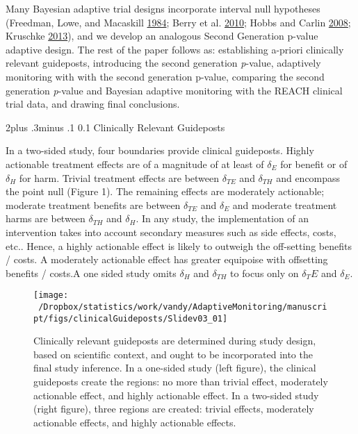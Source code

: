 \documentclass[12pt,oneside]{book}
\makeatletter
\newlength{\li}\setlength{\li}{14.48pt}
\renewcommand\section{ \@startsection {section}{1}{\z@}%
    {2\@bls  plus .3\@bls minus .1\@bls}%
    {0.1\@bls}%
    {\centering\normalfont}}
\theoremstyle{definition}
\theoremstyle{definition}
\theoremstyle{definition}
\theoremstyle{remark}
\makeatother
\begin{document}
Many Bayesian adaptive trial designs incorporate interval null
hypotheses (Freedman, Lowe, and Macaskill
\protect\hyperlink{ref-Freedman:1984wz}{1984}; Berry et al.
\protect\hyperlink{ref-Berry:2010fr}{2010}; Hobbs and Carlin
\protect\hyperlink{ref-Hobbs:2008ce}{2008}; Kruschke
\protect\hyperlink{ref-Kruschke:2013jy}{2013}), and we develop an
analogous Second Generation p-value adaptive design. The rest of the
paper follows as: establishing a-priori clinically relevant guideposts,
introducing the second generation \emph{p}-value, adaptively monitoring
with with the second generation p-value, comparing the second generation
\emph{p}-value and Bayesian adaptive monitoring with the REACH clinical
trial data, and drawing final conclusions.

\hypertarget{clinically-relevant-guideposts}{%
\section{Clinically Relevant
Guideposts}\label{clinically-relevant-guideposts}}

In a two-sided study, four boundaries provide clinical guideposts.
Highly actionable treatment effects are of a magnitude of at least of
\(\delta_E\) for benefit or of \(\delta_H\) for harm. Trivial treatment
effects are between \(\delta_{TE}\) and \(\delta_{TH}\) and encompass
the point null (Figure 1). The remaining effects are moderately
actionable; moderate treatment benefits are between \(\delta_{TE}\) and
\(\delta_{E}\) and moderate treatment harms are between \(\delta_{TH}\)
and \(\delta_{H}\). In any study, the implementation of an intervention
takes into account secondary measures such as side effects, costs, etc..
Hence, a highly actionable effect is likely to outweigh the off-setting
benefits / costs. A moderately actionable effect has greater equipoise
with offsetting benefits / costs.A one sided study omits \(\delta_H\)
and \(\delta_{TH}\) to focus only on \(\delta_TE\) and \(\delta_{E}\).

\begin{figure}[H]

{\centering \texttt{[image: ~/Dropbox/statistics/work/vandy/AdaptiveMonitoring/manuscript/figs/clinicalGuideposts/Slidev03\_01]} 

}

\caption{Clinically relevant guideposts are determined during study design, based on scientific context, and ought to be incorporated into the final study inference.  In a one-sided study (left figure), the clinical guideposts create the regions: no more than trivial effect, moderately actionable effect, and highly actionable effect.  In a two-sided study (right figure), three regions are created: trivial effects, moderately actionable effects, and highly actionable effects.}\label{fig:clinicalGuideposts}
\end{figure}
\end{document}
